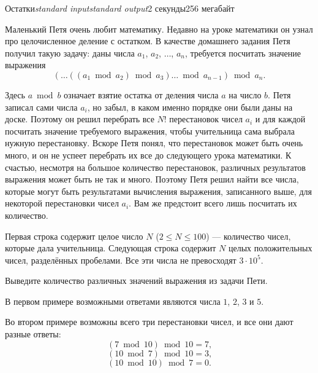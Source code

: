 \begin{problem}{Остатки}{\textsl{standard input}}{\textsl{standard output}}{2 секунды}{256 мегабайт}

Маленький Петя очень любит математику. Недавно на уроке математики он узнал про целочисленное деление с остатком. В качестве домашнего задания Петя получил такую задачу: даны числа $a_1$, $a_2$, $\dots$, $a_n$, требуется посчитать значение выражения 
$$(\dots((a_{1} \bmod a_{2}) \bmod a_{3}) \dots \bmod a_{n - 1}) \bmod a_{n}\text{.}$$

Здесь $a \bmod b$ означает взятие остатка от деления числа $a$ на число $b$. Петя записал сами числа $a_i$, но забыл, в каком именно порядке они были даны на доске. Поэтому он решил перебрать все $N!$ перестановок чисел $a_i$ и для каждой посчитать значение требуемого выражения, чтобы учительница сама выбрала нужную перестановку. Вскоре Петя понял, что перестановок может быть очень много, и он не успеет перебрать их все до следующего урока математики. К счастью, несмотря на большое количество перестановок, различных результатов выражения может быть не так и много. Поэтому Петя решил найти все числа, которые могут быть результатами вычисления выражения, записанного выше, для некоторой перестановки чисел $a_i$. Вам же предстоит всего лишь посчитать их количество.

\InputFile
Первая строка содержит целое число $N$ ($2 \le N \le 100$) --- количество чисел, которые дала учительница. Следующая строка содержит $N$ целых положительных чисел, разделённых пробелами. Все эти числа не превосходят $3 \cdot 10^5$.

\OutputFile
Выведите количество различных значений выражения из задачи Пети.

\Examples

\begin{example}
%
%
%
\end{example}

\Note
В первом примере возможными ответами являются числа $1$, $2$, $3$ и $5$.

Во втором примере возможны всего три перестановки чисел, и все они дают разные ответы:
$$(7 \bmod 10) \bmod 10 = 7\text{,}$$
$$(10 \bmod 7) \bmod 10 = 3\text{,}$$
$$(10 \bmod 10) \bmod 7 = 0\text{.}$$

\end{problem}
